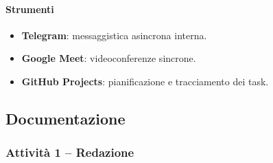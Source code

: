 \documentclass[a4paper, 11pt, oneside]{scrartcl}
\begin{document}
\paragraph{Strumenti}
\begin{itemize}
    \item \textbf{Telegram}: messaggistica asincrona interna.
    \item \textbf{Google Meet}: videoconferenze sincrone.
    \item \textbf{GitHub Projects}: pianificazione e tracciamento dei task.
\end{itemize}

\subsection{Documentazione}
\label{sec:documentazione}

\subsubsection{Attività 1 – Redazione}
\end{document}
